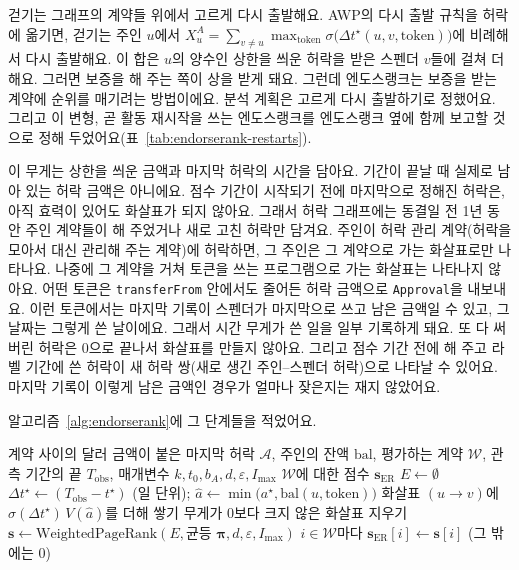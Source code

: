 걷기는 그래프의 계약들 위에서 고르게 다시 출발해요. AWP의 다시 출발 규칙을 허락에 옮기면, 걷기는 주인 $u$에서 $X^A_u=\sum_{v\neq u}\max_{\mathrm{token}}\sigma\bigl(\Delta t^{\star}(u,v,\mathrm{token})\bigr)$에 비례해서 다시 출발해요. 이 합은 $u$의 양수인 상한을 씌운 허락을 받은 스펜더 $v$들에 걸쳐 더해요. 그러면 보증을 해 주는 쪽이 상을 받게 돼요. 그런데 엔도스랭크는 보증을 받는 계약에 순위를 매기려는 방법이에요. 분석 계획은 고르게 다시 출발하기로 정했어요. 그리고 이 변형, 곧 활동 재시작을 쓰는 엔도스랭크를 엔도스랭크 옆에 함께 보고할 것으로 정해 두었어요(표~\ref{tab:endorserank-restarts}).

이 무게는 상한을 씌운 금액과 마지막 허락의 시간을 담아요. 기간이 끝날 때 실제로 남아 있는 허락 금액은 아니에요. 점수 기간이 시작되기 전에 마지막으로 정해진 허락은, 아직 효력이 있어도 화살표가 되지 않아요. 그래서 허락 그래프에는 동결일 전 1년 동안 주인 계약들이 해 주었거나 새로 고친 허락만 담겨요. 주인이 허락 관리 계약(허락을 모아서 대신 관리해 주는 계약)에 허락하면, 그 주인은 그 계약으로 가는 화살표로만 나타나요. 나중에 그 계약을 거쳐 토큰을 쓰는 프로그램으로 가는 화살표는 나타나지 않아요. 어떤 토큰은 \texttt{transferFrom} 안에서도 줄어든 허락 금액으로 \texttt{Approval}을 내보내요. 이런 토큰에서는 마지막 기록이 스펜더가 마지막으로 쓰고 남은 금액일 수 있고, 그 날짜는 그렇게 쓴 날이에요. 그래서 시간 무게가 쓴 일을 일부 기록하게 돼요. 또 다 써 버린 허락은 0으로 끝나서 화살표를 만들지 않아요. 그리고 점수 기간 전에 해 주고 라벨 기간에 쓴 허락이 새 허락 쌍(새로 생긴 주인–스펜더 허락)으로 나타날 수 있어요. 마지막 기록이 이렇게 남은 금액인 경우가 얼마나 잦은지는 재지 않았어요.

알고리즘~\ref{alg:endorserank}에 그 단계들을 적었어요.

\begin{algorithm}[htbp]
\caption{엔도스랭크 그래프 만들기와 점수 매기기}
\label{alg:endorserank}
\begin{algorithmic}[1]
\Require 계약 사이의 달러 금액이 붙은 마지막 허락 $\mathcal{A}$, 주인의 잔액 $\mathrm{bal}$, 평가하는 계약 $\mathcal{W}$, 관측 기간의 끝 $T_{\mathrm{obs}}$, 매개변수 $k,t_0,b_A,d,\varepsilon,I_{\max}$
\Ensure $\mathcal{W}$에 대한 점수 $\mathbf{s}_{\mathrm{ER}}$
\State $E \gets \emptyset$
  \State $\Delta t^{\star} \gets (T_{\mathrm{obs}}-t^{\star})$ (일 단위); $\hat a \gets \min\bigl(a^{\star},\mathrm{bal}(u,\mathrm{token})\bigr)$
  \State 화살표 $(u\to v)$에 $\sigma(\Delta t^{\star})\,V(\hat a)$를 더해 쌓기 
\EndFor
\State 무게가 0보다 크지 않은 화살표 지우기
\State $\mathbf{s} \gets \mathrm{WeightedPageRank}(E, \text{균등 }\boldsymbol{\pi}, d, \varepsilon, I_{\max})$ 
\State \Return $i\in\mathcal{W}$마다 $\mathbf{s}_{\mathrm{ER}}[i] \gets \mathbf{s}[i]$ (그 밖에는 $0$)
\end{algorithmic}
\end{algorithm}

